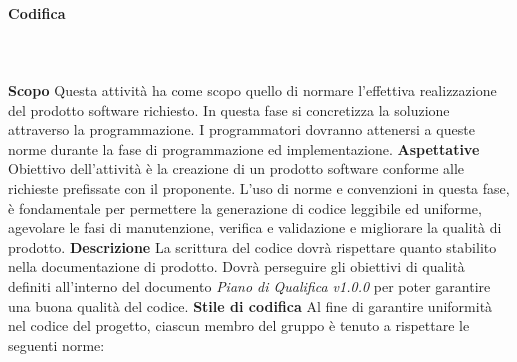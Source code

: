 		\paragraph{Codifica} \mbox{}\\ \mbox{}\\
			\textbf{Scopo} \newline \newline
			Questa attività ha come scopo quello di normare l'effettiva realizzazione del prodotto software richiesto. In questa fase si concretizza la soluzione attraverso la programmazione. I programmatori dovranno attenersi a queste norme durante la fase di programmazione ed implementazione. \newline \newline
			\textbf{Aspettative} \newline \newline
			Obiettivo dell'attività è la creazione di un prodotto software conforme alle richieste	prefissate con il proponente.
			L'uso di norme e convenzioni in questa fase, è fondamentale per permettere la generazione di codice leggibile ed uniforme,  agevolare le fasi di manutenzione,  verifica e validazione e migliorare la qualità di prodotto. \newline \newline
			\textbf{Descrizione} \newline \newline
			La scrittura del codice dovrà rispettare quanto stabilito nella documentazione di prodotto. Dovrà perseguire gli obiettivi di qualità definiti all'interno del documento \textit{Piano di Qualifica v1.0.0} per poter garantire una buona qualità del codice. \newline \newline
			\textbf{Stile di codifica} \newline \newline
			Al fine di garantire uniformità nel codice del progetto, ciascun membro del gruppo è
			tenuto a rispettare le seguenti norme:
